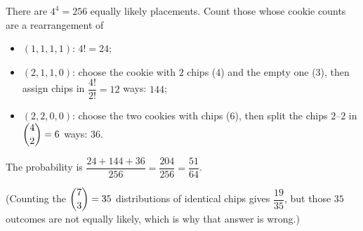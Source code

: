 There are $4^4=256$ equally likely placements. Count those whose cookie counts are a rearrangement of
\begin{itemize}
\item $(1,1,1,1)$: $4!=24$;
\item $(2,1,1,0)$: choose the cookie with $2$ chips ($4$) and the empty one ($3$), then assign chips in $\dfrac{4!}{2!}=12$ ways: $144$;
\item $(2,2,0,0)$: choose the two cookies with chips ($6$), then split the chips $2$--$2$ in $\dbinom42=6$ ways: $36$.
\end{itemize}
The probability is $\dfrac{24+144+36}{256}=\dfrac{204}{256}=\boxed{\dfrac{51}{64}}$.

(Counting the $\dbinom73=35$ distributions of identical chips gives $\dfrac{19}{35}$, but those $35$ outcomes are not equally likely, which is why that answer is wrong.)
